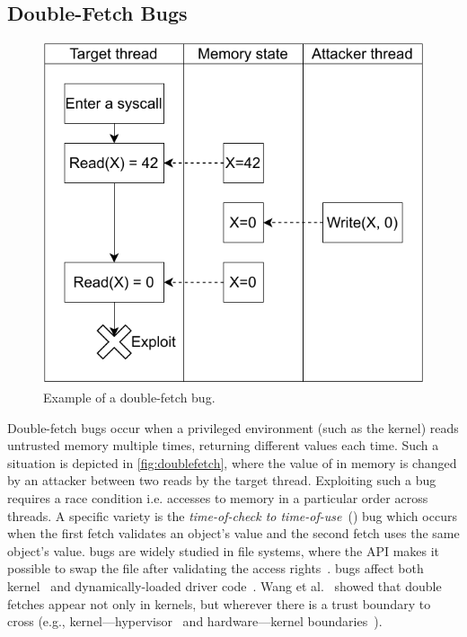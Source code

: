 \subsection{Double-Fetch Bugs}

\begin{figure}[]
  \centering
  \includegraphics[width=.95\linewidth]{media/midas/doublefetch.pdf}
  \caption{Example of a double-fetch bug.}
  \label{fig:doublefetch}
\end{figure}

Double-fetch bugs occur when a privileged environment (such as the kernel)
reads untrusted memory multiple times, returning different values each time.
Such a situation is depicted in \autoref{fig:doublefetch}, 
where the value of  in memory is changed by an attacker
between two reads by the target thread.
Exploiting such a bug requires a race condition i.e. accesses 
to memory in a particular order across threads.
A specific variety is the \emph{time-of-check to time-of-use}~(\tocttou) 
bug which occurs when the first fetch validates an object's value and
the second fetch uses the same object's value.
\tocttou bugs are widely studied in file systems, where the
API makes it possible to swap the file after validating the access
rights~\cite{payer2012protecting,
pu2006methodical, wei2010modeling, tsafrir2008portably,Garfinkel03}.
\tocttou bugs affect both kernel~\cite{jurczyk2013bochspwn, wang2018survey}
and dynamically-loaded driver code~\cite{cve201812633,cve201812633fix}.
Wang et al.~\cite{wang2018survey} showed that double fetches appear not only
in kernels, but wherever there is a trust boundary to cross (e.g.,
kernel---hypervisor~\cite{wilhelm2016xenpwn} and hardware---kernel
boundaries~\cite{lu2018untrusted}).


